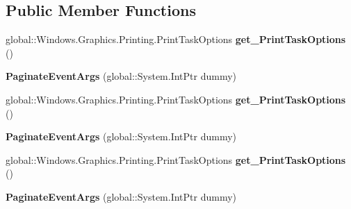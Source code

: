 \subsection*{Public Member Functions}
\begin{DoxyCompactItemize}
\item 
\mbox{\label{class_windows_1_1_u_i_1_1_xaml_1_1_printing_1_1_paginate_event_args_abb34ebf478b806ec23eb3fba9d28cb13}} 
global\+::\+Windows.\+Graphics.\+Printing.\+Print\+Task\+Options {\bfseries get\+\_\+\+Print\+Task\+Options} ()
\item 
\mbox{\label{class_windows_1_1_u_i_1_1_xaml_1_1_printing_1_1_paginate_event_args_a4d0a13d45708e56c2c85c10c133ea58c}} 
{\bfseries Paginate\+Event\+Args} (global\+::\+System.\+Int\+Ptr dummy)
\item 
\mbox{\label{class_windows_1_1_u_i_1_1_xaml_1_1_printing_1_1_paginate_event_args_abb34ebf478b806ec23eb3fba9d28cb13}} 
global\+::\+Windows.\+Graphics.\+Printing.\+Print\+Task\+Options {\bfseries get\+\_\+\+Print\+Task\+Options} ()
\item 
\mbox{\label{class_windows_1_1_u_i_1_1_xaml_1_1_printing_1_1_paginate_event_args_a4d0a13d45708e56c2c85c10c133ea58c}} 
{\bfseries Paginate\+Event\+Args} (global\+::\+System.\+Int\+Ptr dummy)
\item 
\mbox{\label{class_windows_1_1_u_i_1_1_xaml_1_1_printing_1_1_paginate_event_args_abb34ebf478b806ec23eb3fba9d28cb13}} 
global\+::\+Windows.\+Graphics.\+Printing.\+Print\+Task\+Options {\bfseries get\+\_\+\+Print\+Task\+Options} ()
\item 
\mbox{\label{class_windows_1_1_u_i_1_1_xaml_1_1_printing_1_1_paginate_event_args_a4d0a13d45708e56c2c85c10c133ea58c}} 
{\bfseries Paginate\+Event\+Args} (global\+::\+System.\+Int\+Ptr dummy)
\item 
\mbox{\label{class_windows_1_1_u_i_1_1_xaml_1_1_printing_1_1_paginate_event_args_abb34ebf478b806ec23eb3fba9d28cb13}} 

\end{DoxyCompactItemize}
